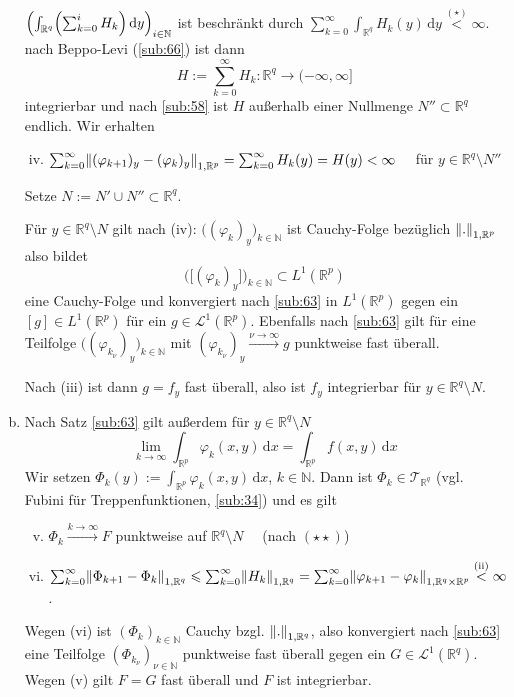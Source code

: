 \begin{enumerate}[a)]
	$\enbrace*{\int_{\mathds{R}^q} \enbrace*{\sum_{k=0}^{i} H_k}  \, \mathrm{d}y }_{i \in \mathds{N}} $ ist beschränkt durch 
	$\sum_{k=0}^{\infty} \int_{\mathds{R}^q}\! H_k(y)  \, \mathrm{d}y \stackrel{(\star)}{<} \infty$. nach Beppo-Levi (\ref{sub:66}) ist dann
	\[
		H := \sum_{k=0}^{\infty} H_k : \mathds{R}^q \to (-\infty, \infty]
	\]
	integrierbar und nach \ref{sub:58} ist $H$ außerhalb einer Nullmenge $N'' \subset \mathds{R}^q$ endlich. Wir erhalten
	\begin{enumerate}[(i)]
		\setcounter{enumii}{3}
		\item $\sum_{k=0}^{\infty} \norm[1, \mathds{R}^p]{(\varphi_{k+1})_y - (\varphi_k)_y}  = \sum_{k=0}^{\infty} H_k(y) = H(y) < \infty \quad$ für 
		$y \in \mathds{R}^q \setminus N''$
	\end{enumerate}
	Setze $N:= N' \cup N'' \subset \mathds{R}^q$.
	
	Für $y \in \mathds{R}^q \setminus N$ gilt nach (iv): $\big((\varphi_k)_y\big)_{k \in \mathds{N}}$ ist Cauchy-Folge bezüglich $\norm[1, \mathds{R}^p]{.} $ also bildet
	\[
		\Big(\big[(\varphi_k)_y\big]\Big)_{k \in \mathds{N}} \subset L^1(\mathds{R}^p)
	\]
	eine Cauchy-Folge und konvergiert nach \ref{sub:63} in $L^1(\mathds{R}^p)$ gegen ein $[g] \in L^1(\mathds{R}^p)$ für ein $g \in \mathcal{L}^1(\mathds{R}^p)$.
	Ebenfalls nach \ref{sub:63} gilt für eine Teilfolge $\big((\varphi_{k_\nu})_y\big)_{k \in \mathds{N}}$ mit $(\varphi_{k_\nu})_y \xrightarrow{\nu \to \infty} g$
	punktweise fast überall.
	
	Nach (iii) ist dann $g=f_y$ fast überall, also ist $f_y$ integrierbar für $y \in \mathds{R}^q \setminus N$.
	\item Nach Satz \ref{sub:63} gilt außerdem für $y \in \mathds{R}^q \setminus N$
	\[
		\lim_{ k \to \infty} \int_{\mathds{R}^p}\! \varphi_k(x,y)  \, \mathrm{d}x = \int_{\mathds{R}^p} f(x,y)  \, \mathrm{d}x \tag{$\star\star$}
	\]
	Wir setzen $\Phi_k (y) := \int_{\mathds{R}^p}\! \varphi_k(x,y) \, \mathrm{d}x $, $k \in \mathds{N}$. Dann ist $\Phi_k \in \mathcal{T}_{\mathds{R}^q}$ (vgl. Fubini für
	Treppenfunktionen, \ref{sub:34}) und es gilt 
	\begin{enumerate}[(i)]
		\setcounter{enumii}{4}
		\item $\Phi_k \xrightarrow{k \to \infty} F$ punktweise auf $\mathds{R}^q \setminus N \quad $ (nach $(\star\star)$)
		\item $ \sum_{k=0}^{\infty} \norm[1, \mathds{R}^q]{\Phi_{k+1} - \Phi_k} \le \sum_{k=0}^{\infty} \norm[1, \mathds{R}^q]{H_k} = \sum_{k=0}^{\infty} \norm[1, 
		\mathds{R}^q \times \mathds{R}^p]{\varphi_{k+1}- \varphi_k} \stackrel{\text{(ii)}}{<} \infty   $.
	\end{enumerate}
	Wegen (vi) ist $(\Phi _k)_{k \in \mathds{N}}$ Cauchy bzgl. $\norm[1,\mathds{R}^q]{.}$, also konvergiert nach \ref{sub:63} eine Teilfolge 
	$(\Phi _{k_\nu})_{\nu \in \mathds{N}}$ punktweise fast überall gegen ein $G \in \mathcal{L}^1(\mathds{R}^q)$. Wegen (v) gilt $F=G$ fast überall und $F$ ist 
	integrierbar.
	

\end{enumerate}
